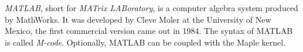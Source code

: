 \documentclass[12pt]{article}
\begin{document}
{\em MATLAB}, short for {\em MATrix LABoratory}, is a computer algebra system produced by MathWorks. It was developed by Cleve Moler at the University of New Mexico, the first commercial version came out in 1984. The syntax of MATLAB is called {\em M-code}. Optionally, MATLAB can be coupled with the Maple kernel.

\end{document}
